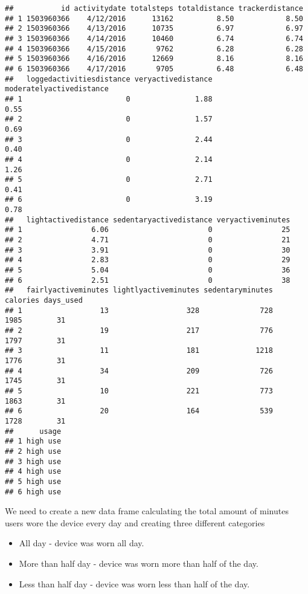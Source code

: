 \documentclass[
]{article}
\providecommand{\tightlist}{%
  \setlength{\itemsep}{0pt}\setlength{\parskip}{0pt}}
\begin{document}
\begin{verbatim}
##           id activitydate totalsteps totaldistance trackerdistance
## 1 1503960366    4/12/2016      13162          8.50            8.50
## 2 1503960366    4/13/2016      10735          6.97            6.97
## 3 1503960366    4/14/2016      10460          6.74            6.74
## 4 1503960366    4/15/2016       9762          6.28            6.28
## 5 1503960366    4/16/2016      12669          8.16            8.16
## 6 1503960366    4/17/2016       9705          6.48            6.48
##   loggedactivitiesdistance veryactivedistance moderatelyactivedistance
## 1                        0               1.88                     0.55
## 2                        0               1.57                     0.69
## 3                        0               2.44                     0.40
## 4                        0               2.14                     1.26
## 5                        0               2.71                     0.41
## 6                        0               3.19                     0.78
##   lightactivedistance sedentaryactivedistance veryactiveminutes
## 1                6.06                       0                25
## 2                4.71                       0                21
## 3                3.91                       0                30
## 4                2.83                       0                29
## 5                5.04                       0                36
## 6                2.51                       0                38
##   fairlyactiveminutes lightlyactiveminutes sedentaryminutes calories days_used
## 1                  13                  328              728     1985        31
## 2                  19                  217              776     1797        31
## 3                  11                  181             1218     1776        31
## 4                  34                  209              726     1745        31
## 5                  10                  221              773     1863        31
## 6                  20                  164              539     1728        31
##      usage
## 1 high use
## 2 high use
## 3 high use
## 4 high use
## 5 high use
## 6 high use
\end{verbatim}

We need to create a new data frame calculating the total amount of
minutes users wore the device every day and creating three different
categories

\begin{itemize}
\tightlist
\item
  All day - device was worn all day.
\item
  More than half day - device was worn more than half of the day.
\item
  Less than half day - device was worn less than half of the day.
\end{itemize}
\end{document}
